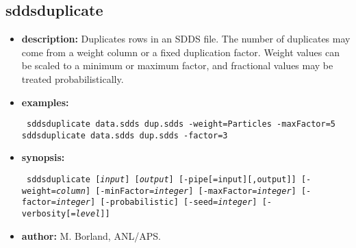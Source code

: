 %
\newpage
\subsection{sddsduplicate}
\label{sddsduplicate}

\begin{itemize}
  \item {\bf description:}
  Duplicates rows in an SDDS file. The number of duplicates may come from a weight column or a fixed duplication factor. Weight values can be scaled to a minimum or maximum factor, and fractional values may be treated probabilistically.
  \item {\bf examples:}
  \begin{flushleft}{\tt
sddsduplicate data.sdds dup.sdds -weight=Particles -maxFactor=5\\
sddsduplicate data.sdds dup.sdds -factor=3
}\end{flushleft}
  \item {\bf synopsis:}
  \begin{flushleft}{\tt
sddsduplicate [{\em input}] [{\em output}] [-pipe[=input][,output]] [-weight={\em column}] [-minFactor={\em integer}] [-maxFactor={\em integer}]
    [-factor={\em integer}] [-probabilistic] [-seed={\em integer}] [-verbosity[={\em level}]]
}\end{flushleft}
  \item {\bf author:} M. Borland, ANL/APS.
\end{itemize}
